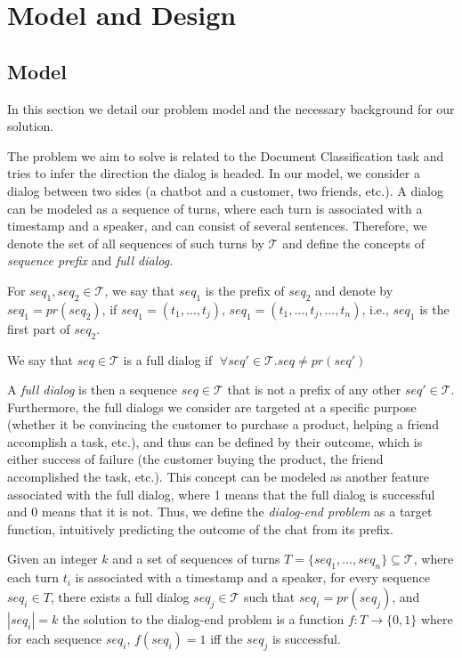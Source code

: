 \section{Model and Design}\label{sec:model}

\subsection{Model}
In this section we detail our problem model and the necessary background 
for our solution.

The problem we aim to solve is related to the Document Classification task 
\cite{attention,Slonim:2002:UDC:564376.564401,DBLP:journals/tkde/IsaLKR08} 
and tries to infer the direction the dialog is headed. 
In our model, we consider a dialog between two sides (a chatbot and a customer, two friends, etc.). 
A dialog can be modeled as a sequence of turns, 
where each turn is associated with a timestamp and a speaker, and can consist of several sentences. 
Therefore, we denote the set of all sequences of 
such turns by $\mathcal{T}$ and define the concepts of {\em sequence prefix} and {\em full dialog}. 

\begin{definition}
For $seq_1, seq_2 \in \mathcal{T}$, we say that $seq_1$ is the 
prefix of $seq_2$ and denote by $seq_1 = pr(seq_2)$, if 
$seq_1 = (t_1, \ldots, t_j)$, $seq_1 = (t_1, \ldots, t_j, \ldots, t_n)$, i.e., $seq_1$ is the 
first part of $seq_2$. 

We say that $seq \in \mathcal{T}$ is a full dialog if $\;\forall seq' \in \mathcal{T}. seq \neq pr(seq')\; $ 
\end{definition}

A {\em full dialog} is then a sequence $seq \in \mathcal{T}$ that is not a prefix 
of any other $seq' \in \mathcal{T}$. 
Furthermore, the full dialogs we consider are targeted at a specific purpose 
(whether it be convincing the customer to purchase a product, helping a friend accomplish a task, etc.), 
and thus can be defined by their outcome, which 
is either success of failure (the customer buying the product, the friend accomplished the task, etc.). 
This concept can be modeled as another feature associated with the full dialog, where 1 means 
that the full dialog is successful and 0 means that it is not. 
Thus, we define the {\em dialog-end problem} as a target function, intuitively predicting the outcome of the chat from its prefix.

\begin{definition}
Given an integer $k$ and a set of sequences of turns $T=\{seq_1, \ldots, seq_n\} \subseteq \mathcal{T}$,
where each turn $t_i$ is associated with a timestamp and a speaker, for every sequence $seq_i\in T$, there exists a full dialog $seq_j\in \mathcal{T}$ such that $seq_i = pr(seq_j)$, and $|seq_i| = k$ the solution to the dialog-end 
problem is a function $f:T \to \{0,1\}$ where for each sequence $seq_i$, $f(seq_i) = 1$ iff the $seq_j$ is successful. 
\end{definition}


